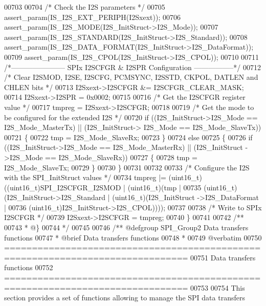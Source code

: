 \begin{DoxyCode}
00703 
00704   \textcolor{comment}{/* Check the I2S parameters */}
00705   assert_param(IS\_I2S\_EXT\_PERIPH(I2Sxext));
00706   assert_param(IS\_I2S\_MODE(I2S\_InitStruct->I2S\_Mode));
00707   assert_param(IS\_I2S\_STANDARD(I2S\_InitStruct->I2S\_Standard));
00708   assert_param(IS\_I2S\_DATA\_FORMAT(I2S\_InitStruct->I2S\_DataFormat));
00709   assert_param(IS\_I2S\_CPOL(I2S\_InitStruct->I2S\_CPOL));
00710 
00711 \textcolor{comment}{/*----------------------- SPIx I2SCFGR & I2SPR Configuration -----------------*/}
00712   \textcolor{comment}{/* Clear I2SMOD, I2SE, I2SCFG, PCMSYNC, I2SSTD, CKPOL, DATLEN and CHLEN bits */}
00713   I2Sxext->I2SCFGR &= I2SCFGR_CLEAR_MASK;
00714   I2Sxext->I2SPR = 0x0002;
00715 
00716   \textcolor{comment}{/* Get the I2SCFGR register value */}
00717   tmpreg = I2Sxext->I2SCFGR;
00718 
00719   \textcolor{comment}{/* Get the mode to be configured for the extended I2S */}
00720   \textcolor{keywordflow}{if} ((I2S\_InitStruct->I2S_Mode == I2S_Mode_MasterTx) || (I2S\_InitStruct->
      I2S_Mode == I2S_Mode_SlaveTx))
00721   \{
00722     tmp = I2S_Mode_SlaveRx;
00723   \}
00724   \textcolor{keywordflow}{else}
00725   \{
00726     \textcolor{keywordflow}{if} ((I2S\_InitStruct->I2S_Mode == I2S_Mode_MasterRx) || (I2S\_InitStruct
      ->I2S_Mode == I2S_Mode_SlaveRx))
00727     \{
00728       tmp = I2S_Mode_SlaveTx;
00729     \}
00730   \}
00731 
00732 
00733   \textcolor{comment}{/* Configure the I2S with the SPI\_InitStruct values */}
00734   tmpreg |= (uint16\_t)((uint16\_t)SPI_I2SCFGR_I2SMOD | (uint16\_t)(tmp |
00735                   (uint16\_t)(I2S\_InitStruct->I2S_Standard | (uint16\_t)(I2S\_InitStruct
      ->I2S_DataFormat |
00736                   (uint16\_t)I2S\_InitStruct->I2S_CPOL))));
00737 
00738   \textcolor{comment}{/* Write to SPIx I2SCFGR */}
00739   I2Sxext->I2SCFGR = tmpreg;
00740 \}
00741 
00742 \textcolor{comment}{/**}
00743 \textcolor{comment}{  * @\}}
00744 \textcolor{comment}{  */}
00745 
00746 \textcolor{comment}{/** @defgroup SPI\_Group2 Data transfers functions}
00747 \textcolor{comment}{ *  @brief   Data transfers functions}
00748 \textcolor{comment}{ *}
00749 \textcolor{comment}{@verbatim   }
00750 \textcolor{comment}{ ===============================================================================}
00751 \textcolor{comment}{                         Data transfers functions}
00752 \textcolor{comment}{ ===============================================================================  }
00753 \textcolor{comment}{}
00754 \textcolor{comment}{  This section provides a set of functions allowing to manage the SPI data transfers}

\end{DoxyCode}
